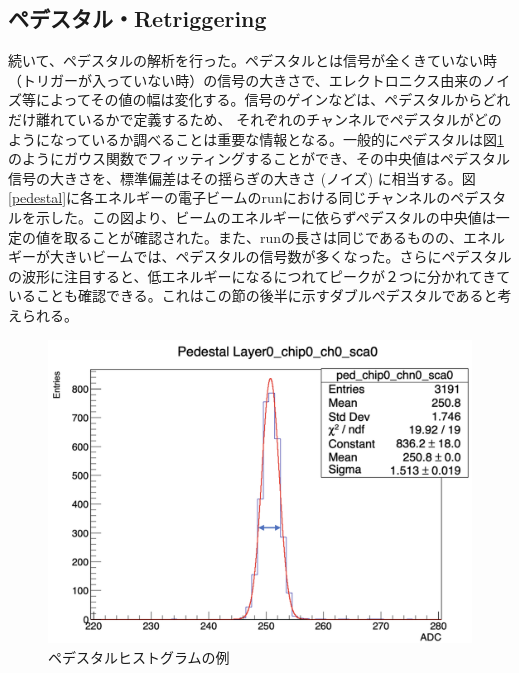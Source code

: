 \subsection{ペデスタル・Retriggering}
続いて、ペデスタルの解析を行った。ペデスタルとは信号が全くきていない時（トリガーが入っていない時）の信号の大きさで、エレクトロニクス由来のノイズ等によってその値の幅は変化する。信号のゲインなどは、ペデスタルからどれだけ離れているかで定義するため、 それぞれのチャンネルでペデスタルがどのようになっているか調べることは重要な情報となる。一般的にぺデスタルは図\ref{ped}のようにガウス関数でフィッティングすることができ、その中央値はペデスタル信号の大きさを、標準偏差はその揺らぎの大きさ (ノイズ) に相当する。図\ref{pedestal}に各エネルギーの電子ビームのrunにおける同じチャンネルのペデスタルを示した。この図より、ビームのエネルギーに依らずぺデスタルの中央値は一定の値を取ることが確認された。また、runの長さは同じであるものの、エネルギーが大きいビームでは、ペデスタルの信号数が多くなった。さらにペデスタルの波形に注目すると、低エネルギーになるにつれてピークが２つに分かれてきていることも確認できる。これはこの節の後半に示すダブルぺデスタルであると考えられる。\\
\begin{figure}[H]
\begin{center}
 \includegraphics[keepaspectratio, scale=0.3]
 	{Figure/Beamtest/ped.png}
 		\caption{ペデスタルヒストグラムの例}
		\label{ped}
\end{center}
\end{figure}
